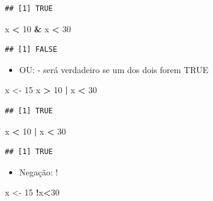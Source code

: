 \documentclass[
]{book}
\newenvironment{Shaded}{\begin{snugshade}}{\end{snugshade}}
\newcommand{\DecValTok}[1]{\textcolor[rgb]{0.00,0.00,0.81}{#1}}
\newcommand{\NormalTok}[1]{#1}
\newcommand{\OperatorTok}[1]{\textcolor[rgb]{0.81,0.36,0.00}{\textbf{#1}}}
\newcommand{\StringTok}[1]{\textcolor[rgb]{0.31,0.60,0.02}{#1}}
\providecommand{\tightlist}{%
  \setlength{\itemsep}{0pt}\setlength{\parskip}{0pt}}
\begin{document}
\begin{verbatim}
## [1] TRUE
\end{verbatim}

\begin{Shaded}
\begin{Highlighting}[]
\NormalTok{x }\OperatorTok{<}\StringTok{ }\DecValTok{10} \OperatorTok{&}\StringTok{ }\NormalTok{x }\OperatorTok{<}\StringTok{ }\DecValTok{30}
\end{Highlighting}
\end{Shaded}

\begin{verbatim}
## [1] FALSE
\end{verbatim}

\begin{itemize}
\tightlist
\item
  OU: \textbar{} - será verdadeiro se um dos dois forem TRUE
\end{itemize}

\begin{Shaded}
\begin{Highlighting}[]
\NormalTok{x <-}\StringTok{ }\DecValTok{15}
\NormalTok{x }\OperatorTok{>}\StringTok{ }\DecValTok{10} \OperatorTok{|}\StringTok{ }\NormalTok{x }\OperatorTok{<}\StringTok{ }\DecValTok{30}
\end{Highlighting}
\end{Shaded}

\begin{verbatim}
## [1] TRUE
\end{verbatim}

\begin{Shaded}
\begin{Highlighting}[]
\NormalTok{x }\OperatorTok{<}\StringTok{ }\DecValTok{10} \OperatorTok{|}\StringTok{ }\NormalTok{x }\OperatorTok{<}\StringTok{ }\DecValTok{30}
\end{Highlighting}
\end{Shaded}

\begin{verbatim}
## [1] TRUE
\end{verbatim}

\begin{itemize}
\tightlist
\item
  Negação: !
\end{itemize}

\begin{Shaded}
\begin{Highlighting}[]
\NormalTok{x <-}\StringTok{ }\DecValTok{15}
\OperatorTok{!}\NormalTok{x}\OperatorTok{<}\DecValTok{30}
\end{Highlighting}
\end{Shaded}
\end{document}
